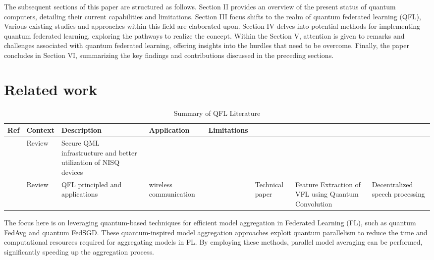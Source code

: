 The subsequent sections of this paper are structured as follows.
Section II provides an overview of the present status of quantum computers, detailing their current capabilities and limitations.
Section III focus shifts to the realm of quantum federated learning (QFL), Various existing studies and approaches within this field are elaborated upon.
Section IV delves into potential methods for implementing quantum federated learning, exploring the pathways to realize the concept.
Within the Section V, attention is given to remarks and challenges associated with quantum federated learning, offering insights into the hurdles that need to be overcome. Finally, the paper concludes in Section VI, summarizing the key findings and contributions discussed in the preceding sections.

\section{Related work}

 \begin{table*}[h]
 \begin{center}
  \scriptsize
\caption{Summary of QFL Literature}
\label{tbl:TechnicalComparison}
\setlength{\tabcolsep}{1.7pt}
\begin{tabular}{p{0.5cm}p{3.25cm}p{4cm}p{4cm}p{4cm}}
 \hline \toprule
{\textbf{Ref}}	&	{\textbf{Context}}&  {\textbf{Description}} &{\textbf{Application}} &{\textbf{Limitations}}\\

\hline
\cite{chen2021federated}&
Review&
Secure QML infrastructure and better utilization of NISQ
devices
& \\

\cite{pujahari2022quantum}&
Review&
QFL principled and applications&
wireless communication
&

\cite{yang2021decentralizing}
& Technical paper
& Feature Extraction of VFL using Quantum Convolution
& Decentralized speech processing
&\\


\bottomrule
\end{tabular}
\label{table:Analysis}
 \end{center}
\end{table*}

The focus here is on leveraging quantum-based techniques for efficient model aggregation in Federated Learning (FL), such as quantum FedAvg and quantum FedSGD. These quantum-inspired model aggregation approaches exploit quantum parallelism to reduce the time and computational resources required for aggregating models in FL. By employing these methods, parallel model averaging can be performed, significantly speeding up the aggregation process.

